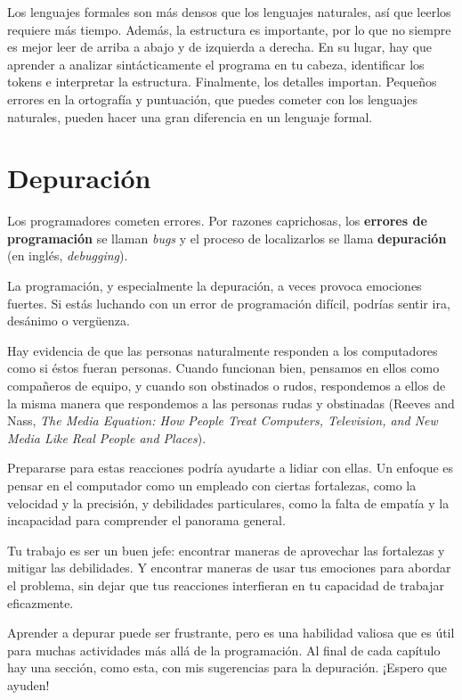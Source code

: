 \documentclass[10pt]{book}
\begin{document}
Los lenguajes formales son más densos
que los lenguajes naturales, así que leerlos requiere más tiempo.  Además, la
estructura es importante, por lo que no siempre es mejor leer
de arriba a abajo y de izquierda a derecha.  En su lugar, hay que aprender a analizar
sintácticamente el programa en tu cabeza, identificar los tokens e interpretar
la estructura.  Finalmente, los detalles importan.  Pequeños errores en
la ortografía y puntuación, que puedes cometer
con los lenguajes naturales, pueden hacer una gran diferencia en un lenguaje
formal.


\section{Depuración}

Los programadores cometen errores.  Por razones caprichosas, los {\bf errores
de programación} se llaman {\em bugs} y el proceso de localizarlos se llama
{\bf depuración} (en inglés, {\em debugging}).

La programación, y especialmente la depuración, a veces provoca emociones
fuertes.  Si estás luchando con un error de programación difícil, podrías
sentir ira, desánimo o vergüenza.

Hay evidencia de que las personas naturalmente responden a los computadores
como si éstos fueran personas.  Cuando funcionan bien, pensamos en ellos como
compañeros de equipo, y cuando son obstinados o rudos, respondemos a ellos
de la misma manera que respondemos a las personas rudas
y obstinadas (Reeves and Nass, {\it The Media
    Equation: How People Treat Computers, Television, and New Media
    Like Real People and Places}).

Prepararse para estas reacciones podría ayudarte a lidiar con ellas.
Un enfoque es pensar en el computador como un empleado con
ciertas fortalezas, como la velocidad y la precisión, y
debilidades particulares, como la falta de empatía y la incapacidad
para comprender el panorama general.

Tu trabajo es ser un buen jefe: encontrar maneras de aprovechar las
fortalezas y mitigar las debilidades.  Y encontrar maneras
de usar tus emociones para abordar el problema,
sin dejar que tus reacciones interfieran en tu capacidad
de trabajar eficazmente.

Aprender a depurar puede ser frustrante, pero es una habilidad valiosa
que es útil para muchas actividades más allá de la programación.  Al final
de cada capítulo hay una sección, como esta,
con mis sugerencias para la depuración.  ¡Espero que ayuden!
\end{document}
